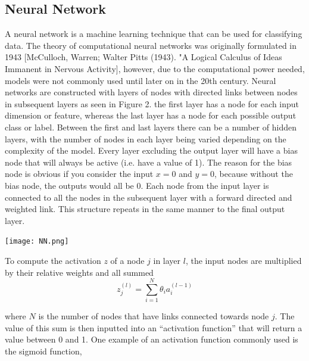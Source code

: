 \documentclass[a4paper,11pt,twoside]{article}
\begin{document}
\subsection{Neural Network}

A neural network is a machine learning technique that can be used for classifying data. The theory of computational neural networks was originally formulated in 1943 [McCulloch, Warren; Walter Pitts (1943). "A Logical Calculus of Ideas Immanent in Nervous Activity], however, due to the computational power needed, models were not commonly used until later on in the 20th century.  
\newline
\newline
Neural networks are constructed with layers of nodes with directed links between nodes in subsequent layers as seen in Figure 2. the first layer has a node for each input dimension or feature, whereas the last layer has a node for each possible output class or label. Between the first and last layers there can be a number of hidden layers, with the number of nodes in each layer being varied depending on the complexity of the model. Every layer excluding the output layer will have a bias node that will always be active (i.e. have a value of 1). The reason for the bias node is obvious if you consider the input $x=0$ and $y=0$, because without the bias node, the outputs would all be 0. Each node from the input layer is connected to all the nodes in the subsequent layer with a forward directed and weighted link. This structure repeats in the same manner to the final output layer. 

\begin{center}
\texttt{[image: NN.png]}

\end{center}

To compute the activation $z$ of a node $j$ in layer $l$, the input nodes are multiplied by their relative weights and all summed
\begin{equation}
z^{(l)}_j = \sum_{i=1}^N \theta_i a^{(l-1)}_i
\end{equation}

where $N$ is the number of nodes that have links connected towards node $j$. The value of this sum is then inputted into an “activation function” that will return a value between 0 and 1. One example of an activation function commonly used is the sigmoid function, 
\end{document}
